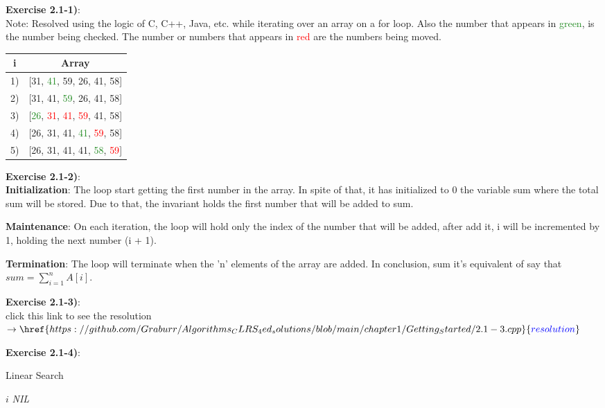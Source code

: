 \documentclass{article}
\newcounter{exercise}[section]   %
\begin{document}
\textbf{Exercise 2.1-1)}:\\
Note: Resolved using the logic of C, C++, Java, etc. while iterating over an array on a for
loop. Also the number that appears in \textcolor{ForestGreen}{green}, is the number being 
checked. The number or numbers that appears in \textcolor{Red}{red} are the numbers being 
moved.

\begin{center}
    \begin{tabular}{|c|c|}
    \hline
    \textbf{i} & \textbf{Array} \\
    \hline
    1) & [31, \textcolor{ForestGreen}{41}, 59, 26, 41, 58]\\
    2) & [31, 41, \textcolor{ForestGreen}{59}, 26, 41, 58]\\
    3) & [\textcolor{ForestGreen}{26}, \textcolor{Red}{31}, \textcolor{Red}{41}, 
          \textcolor{Red}{59}, 41, 58]\\
    4) & [26, 31, 41, \textcolor{ForestGreen}{41}, \textcolor{Red}{59}, 58]\\
    5) & [26, 31, 41, 41, \textcolor{ForestGreen}{58}, \textcolor{Red}{59}]\\
    \hline
    \end{tabular}
\end{center}

\textbf{Exercise 2.1-2)}:\\
\textbf{Initialization}: The loop start getting the first number in the array. In spite of 
that, it has initialized to 0 the variable sum where the total sum will be stored. Due to 
that, the invariant holds the first number that will be added to sum.

\textbf{Maintenance}: On each iteration, the loop will hold only the index of the number 
that will be added, after add it, i will be incremented by 1, holding the next number (i + 1).

\textbf{Termination}: The loop will terminate when the 'n' elements of the array are added. In conclusion,
sum it's equivalent of say that $sum = \sum_{i = 1}^{n} A[i]$.
    
\textbf{Exercise 2.1-3)}:\\
click this link to see the resolution \(\rightarrow \href{https://github.com/Graburr/Algorithms_CLRS_4ed_solutions/blob/main/chapter1/Getting_Started/2.1-3.cpp}
{\textcolor{blue}{resolution}}\)

\textbf{Exercise 2.1-4)}:\\
\begin{algorithm}
\caption{Linear Search}\label{linearSearchID}
\begin{algorithmic}[1]
            \Return $i$
        \EndIf
    \EndFor
    \State \Return \textit{NIL}
\EndFunction
\end{algorithmic}
\end{algorithm}
\end{document}
